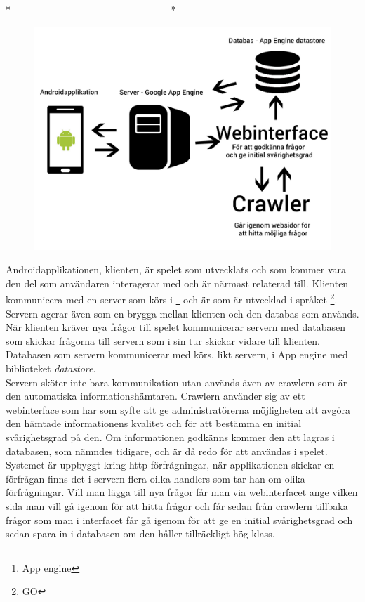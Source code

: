 \documentclass[12pt,a4paper]{article}
\begin{document}
*-------------------------------------------------*
\begin{figure}[H]
\centering
\includegraphics[scale=0.2]{systemstruktur.jpg} 
\end{figure} 

Androidapplikationen, klienten, är spelet som utvecklats och som kommer vara den del som användaren interagerar med och är närmast relaterad till. Klienten kommunicera med en server som körs i \footnote{ App engine} och är som är utvecklad i språket \footnote{ GO}. Servern agerar även som en brygga mellan klienten och den databas som används. När klienten kräver nya frågor till spelet kommunicerar servern med databasen som skickar frågorna till servern som i sin tur skickar vidare till klienten. Databasen som servern kommunicerar med körs, likt servern, i App engine med biblioteket \textit{datastore}. \\Servern sköter inte bara kommunikation utan används även av crawlern som är den automatiska informationshämtaren. Crawlern använder sig av ett webinterface som har som syfte att ge administratörerna möjligheten att avgöra den hämtade informationens kvalitet och för att bestämma en initial svårighetsgrad på den. Om informationen godkänns kommer den att lagras i databasen, som nämndes tidigare, och är då redo för att användas i spelet.
\\
Systemet är uppbyggt kring http förfrågningar, när applikationen skickar en förfrågan finns det i servern flera oilka handlers som tar han om olika förfrågningar. Vill man lägga till nya frågor får man via webinterfacet ange vilken sida man vill gå igenom för att hitta frågor och får sedan från crawlern tillbaka frågor som man i interfacet får gå igenom för att ge en initial svårighetsgrad och sedan spara in i databasen om den håller tillräckligt hög klass.
\end{document}
